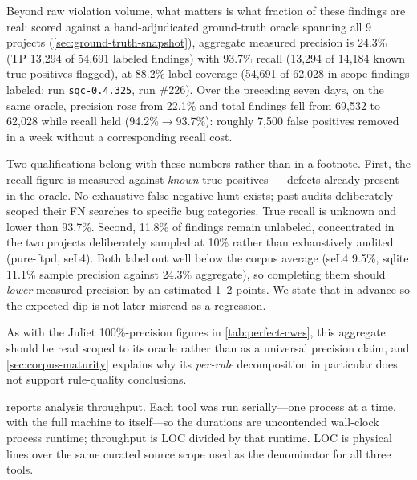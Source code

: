 Beyond raw violation volume, what matters is what fraction of these
findings are real: scored against a hand-adjudicated ground-truth
oracle spanning all 9 projects (\cref{sec:ground-truth-snapshot}), aggregate
measured precision is 24.3\% (TP 13,294 of 54,691 labeled findings) with
93.7\% recall (13,294 of 14,184 known true positives flagged), at 88.2\%
label coverage (54,691 of 62,028 in-scope findings labeled;
run \texttt{sqc-0.4.325}, run \#226). Over the preceding seven days, on
the same oracle, precision rose from 22.1\% and total findings fell from
69,532 to 62,028 while recall held (94.2\%$\to$93.7\%): roughly 7,500
false positives removed in a week without a corresponding recall cost.

Two qualifications belong with these numbers rather than in a footnote.
First, the recall figure is measured against \emph{known} true
positives --- defects already present in the oracle. No exhaustive
false-negative hunt exists; past audits deliberately scoped their FN
searches to specific bug categories. True recall is unknown and lower
than 93.7\%.  Second, 11.8\% of findings remain unlabeled, concentrated
in the two projects deliberately sampled at 10\% rather than
exhaustively audited (pure-ftpd, seL4). Both label out well below the
corpus average (seL4 9.5\%, sqlite 11.1\% sample precision against
24.3\% aggregate), so completing them should \emph{lower} measured
precision by an estimated 1--2 points. We state that in advance so the
expected dip is not later misread as a regression.

As with the Juliet 100\%-precision figures in \cref{tab:perfect-cwes},
this aggregate should be read scoped to its oracle rather than as a
universal precision claim, and \cref{sec:corpus-maturity} explains why
its \emph{per-rule} decomposition in particular does not support
rule-quality conclusions.

 reports analysis throughput.  Each tool was
run serially---one process at a time, with the full machine to itself---so
the durations are uncontended wall-clock process runtime; throughput is
LOC divided by that runtime.  LOC is physical lines over the same curated
source scope used as the denominator for all three tools.

